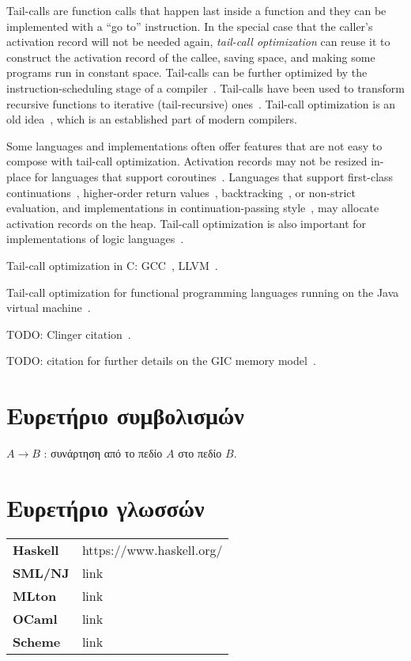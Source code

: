 \documentclass[diploma]{softlab-thesis}
\begin{document}
Tail-calls are function calls that happen last inside a function and
they can be implemented with a ``go to'' instruction. In the special
case that the caller's activation record will not be needed again,
\emph{tail-call optimization} can reuse it to construct the activation
record of the callee, saving space, and making some programs run in
constant space. Tail-calls can be further optimized by the
instruction-scheduling stage of a compiler~\cite[\S12.4.3]{Torczon12}.
Tail-calls have been used to transform recursive functions to
iterative (tail-recursive)
ones~\cite[\S{9}]{McCarthy62}\cite{Barron68}.  Tail-call optimization
is an old idea~\cite[p.~7]{Gill65}\cite[p.~21]{Knuth74}, which is an
established part of modern compilers.

Some languages and implementations often offer features that are not
easy to compose with tail-call optimization. Activation records may
not be resized in-place for languages that support
coroutines~\cite[p.~60]{Waite84}. Languages that support first-class
continuations~\cite{Sperber10}, higher-order return
values~\cite[p.~103]{Appel92}\cite{Steele78},
backtracking~\cite{Bobrow73}, or non-strict evaluation, and
implementations in continuation-passing style~\cite[p.~103]{Appel92},
may allocate activation records on the heap. Tail-call optimization is
also important for implementations of logic languages~\cite{Bigot99}.

Tail-call optimization in C: GCC~\cite{Probst01}, LLVM~\cite{Pandey:2015:LC:2842773}.

Tail-call optimization for functional programming languages running on
the Java virtual machine~\cite{Madsen:2018:TCE:3178372.3179499}.

TODO: Clinger citation~\cite{Clinger:1998:PTR:277650.277719}.

TODO: citation for further details on the GIC memory model~\cite{Fourtounis14}.

\chapter{Ευρετήριο συμβολισμών}

$A \rightarrow B$ : συνάρτηση από το πεδίο $A$ στο πεδίο $B$.

\chapter{Ευρετήριο γλωσσών}

\begin{tabular}{ll}
  \textbf{Haskell} & https://www.haskell.org/\\
  \textbf{SML/NJ} & link\\
  \textbf{MLton} & link\\
  \textbf{OCaml} & link\\
  \textbf{Scheme} & link\\
\end{tabular}




\end{document}

